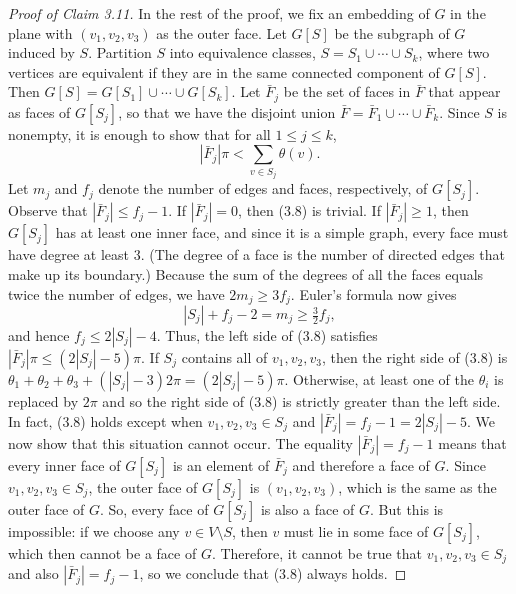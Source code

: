 \documentclass[UTF8,11pt]{ctexart}
\theoremstyle{definition}
\begin{document}
\begin{proof}[Proof of Claim 3.11]
In the rest of the proof, we fix an embedding of $G$ in the plane with $(v_1,v_2,v_3)$ as the outer face. Let $G[S]$ be the subgraph of $G$ induced by $S$. Partition $S$ into equivalence classes, $S=S_1\cup\cdots\cup S_k$, where two vertices are equivalent if they are in the same connected component of $G[S]$. Then $G[S]=G[S_1]\cup\cdots\cup G[S_k]$. Let $\bar F_j$ be the set of faces in $\bar F$ that appear as faces of $G[S_j]$, so that we have the disjoint union $\bar F=\bar F_1\cup\cdots\cup\bar F_k$. Since $S$ is nonempty, it is enough to show that for all $1\le j\le k$,
\[
|\bar F_j|\pi<\sum_{v\in S_j}\theta(v).\tag{3.8}
\]
Let $m_j$ and $f_j$ denote the number of edges and faces, respectively, of $G[S_j]$. Observe that $|\bar F_j|\le f_j-1$. If $|\bar F_j|=0$, then (3.8) is trivial. If $|\bar F_j|\ge1$, then $G[S_j]$ has at least one inner face, and since it is a simple graph, every face must have degree at least $3$. (The degree of a face is the number of directed edges that make up its boundary.) Because the sum of the degrees of all the faces equals twice the number of edges, we have $2m_j\ge3f_j$. Euler's formula now gives
\[
|S_j|+f_j-2=m_j\ge\tfrac32 f_j,
\]
and hence $f_j\le2|S_j|-4$. Thus, the left side of (3.8) satisfies $|\bar F_j|\pi\le(2|S_j|-5)\pi$.
If $S_j$ contains all of $v_1,v_2,v_3$, then the right side of (3.8) is
$\theta_1+\theta_2+\theta_3+(|S_j|-3)2\pi=(2|S_j|-5)\pi$. Otherwise, at least one of the $\theta_i$ is replaced by $2\pi$ and so the right side of (3.8) is strictly greater than the left side. In fact, (3.8) holds except when $v_1,v_2,v_3\in S_j$ and $|\bar F_j|=f_j-1=2|S_j|-5$. We now show that this situation cannot occur.
The equality $|\bar F_j|=f_j-1$ means that every inner face of $G[S_j]$ is an element of $\bar F_j$ and therefore a face of $G$. Since $v_1,v_2,v_3\in S_j$, the outer face of $G[S_j]$ is $(v_1,v_2,v_3)$, which is the same as the outer face of $G$. So, every face of $G[S_j]$ is also a face of $G$. But this is impossible: if we choose any $v\in V\setminus S$, then $v$ must lie in some face of $G[S_j]$, which then cannot be a face of $G$. Therefore, it cannot be true that $v_1,v_2,v_3\in S_j$ and also $|\bar F_j|=f_j-1$, so we conclude that (3.8) always holds.
\end{proof}
\end{document}
